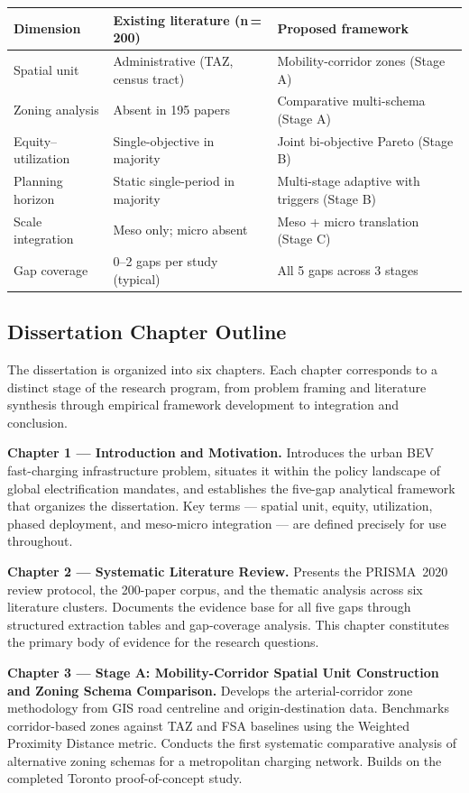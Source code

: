 \documentclass[12pt,letterpaper]{article}
\begin{document}
\smallskip
\begin{tabularx}{\textwidth}{@{}lXX@{}}
  \toprule
  \textbf{Dimension} & \textbf{Existing literature (n\,=\,200)} &
  \textbf{Proposed framework} \\
  \midrule
  Spatial unit      & Administrative (TAZ, census tract) & Mobility-corridor zones (Stage A) \\
  Zoning analysis   & Absent in 195 papers               & Comparative multi-schema (Stage A) \\
  Equity–utilization & Single-objective in majority       & Joint bi-objective Pareto (Stage B) \\
  Planning horizon  & Static single-period in majority   & Multi-stage adaptive with triggers (Stage B) \\
  Scale integration & Meso only; micro absent            & Meso + micro translation (Stage C) \\
  Gap coverage      & 0–2 gaps per study (typical)       & All 5 gaps across 3 stages \\
  \bottomrule
\end{tabularx}

\subsection{Dissertation Chapter Outline}

The dissertation is organized into six chapters.  Each chapter
corresponds to a distinct stage of the research program, from
problem framing and literature synthesis through empirical framework
development to integration and conclusion.

\textbf{Chapter 1 --- Introduction and Motivation.}
Introduces the urban BEV fast-charging infrastructure problem,
situates it within the policy landscape of global electrification
mandates, and establishes the five-gap analytical framework that
organizes the dissertation.  Key terms --- spatial unit, equity,
utilization, phased deployment, and meso-micro integration ---
are defined precisely for use throughout.

\textbf{Chapter 2 --- Systematic Literature Review.}
Presents the PRISMA~2020 review protocol, the 200-paper corpus, and
the thematic analysis across six literature clusters.  Documents
the evidence base for all five gaps through structured extraction
tables and gap-coverage analysis.  This chapter constitutes the
primary body of evidence for the research questions.

\textbf{Chapter 3 --- Stage A: Mobility-Corridor Spatial Unit
Construction and Zoning Schema Comparison.}
Develops the arterial-corridor zone methodology from GIS road
centreline and origin-destination data.  Benchmarks corridor-based
zones against TAZ and FSA baselines using the Weighted Proximity
Distance metric.  Conducts the first systematic comparative analysis
of alternative zoning schemas for a metropolitan charging network.
Builds on the completed Toronto proof-of-concept study.
\end{document}
